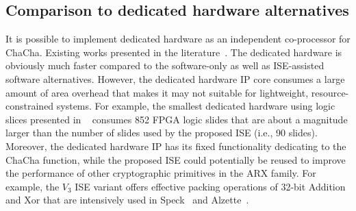 \subsection{Comparison to dedicated hardware alternatives}
It is possible to implement dedicated hardware as an independent co-processor for ChaCha. 
Existing works presented in the literature~\cite{KLA:19,PRH:19}.
The dedicated hardware is obviously much faster compared to the software-only as well as ISE-assisted software alternatives.
However, the dedicated hardware IP core consumes a large amount of area overhead 
that makes it may not suitable for lightweight, resource-constrained systems.
For example, the smallest dedicated hardware using logic slices presented in ~\cite{PRH:19} consumes 852 FPGA logic slides that are about a magnitude larger than the number of slides used by the proposed ISE (i.e., 90 slides).
Moreover, the dedicated hardware IP has its fixed functionality dedicating to the ChaCha function, 
while the proposed ISE could potentially be reused 
to improve the performance of other cryptographic primitives in the ARX family.   
For example, the $V_3$ ISE variant offers effective packing operations of 32-bit Addition and Xor 
that are intensively used in Speck~\cite{BSSTWW:13} and Alzette~\cite{BBC:20}.  


